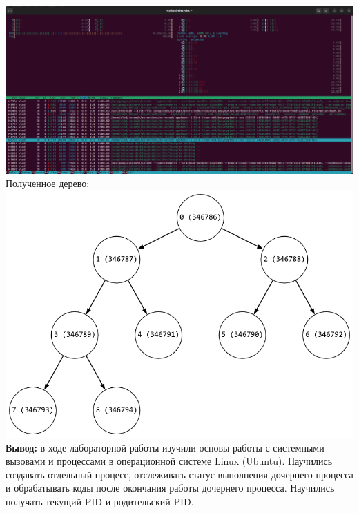 \documentclass[a4paper,14pt]{extarticle}
\begin{document}
\includegraphics[width=140mm]{modified_htop_after}\\
Полученное дерево:\\
\includegraphics[width=140mm]{modified.png}\\

\textbf{Вывод: } в ходе лабораторной работы изучили основы работы с системными вызовами и процессами в операционной
системе Linux (Ubuntu). Научились создавать отдельный процесс, отслеживать статус выполнения дочернего процесса и обрабатывать 
коды после окончания работы дочернего процесса. Научились получать текущий PID и родительский PID.
\end{document}
